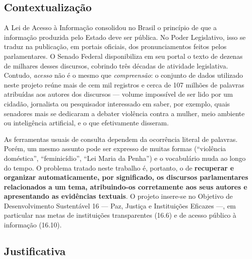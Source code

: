 \documentclass[12pt]{article}
\begin{document}
\subsection{Contextualização}

A Lei de Acesso à Informação \cite{brasil2011} consolidou no Brasil o princípio de que a
informação produzida pelo Estado deve ser pública. No Poder Legislativo, isso se traduz na
publicação, em portais oficiais, dos pronunciamentos feitos pelos parlamentares. O Senado Federal
disponibiliza em seu portal o texto de dezenas de milhares desses discursos, cobrindo três
décadas de atividade legislativa. Contudo, \emph{acesso} não é o mesmo que \emph{compreensão}: o
conjunto de dados utilizado neste projeto reúne mais de cem mil registros e cerca de 107 milhões
de palavras atribuídas aos autores dos discursos --- volume impossível de ser lido por um
cidadão, jornalista ou pesquisador interessado em saber, por exemplo, quais senadores mais se
dedicaram a debater violência contra a mulher, meio ambiente ou inteligência artificial, e o que
efetivamente disseram.

As ferramentas usuais de consulta dependem da ocorrência literal de palavras. Porém, um mesmo
assunto pode ser expresso de muitas formas (``violência doméstica'', ``feminicídio'', ``Lei Maria
da Penha'') e o vocabulário muda ao longo do tempo. O problema tratado neste trabalho é, portanto,
o de \textbf{recuperar e organizar automaticamente, por significado, os discursos parlamentares
relacionados a um tema, atribuindo-os corretamente aos seus autores e apresentando as evidências
textuais}. O projeto insere-se no Objetivo de Desenvolvimento Sustentável 16 --- Paz, Justiça e
Instituições Eficazes \cite{onu2015} ---, em particular nas metas de instituições transparentes
(16.6) e de acesso público à informação (16.10).

\subsection{Justificativa}
\end{document}
